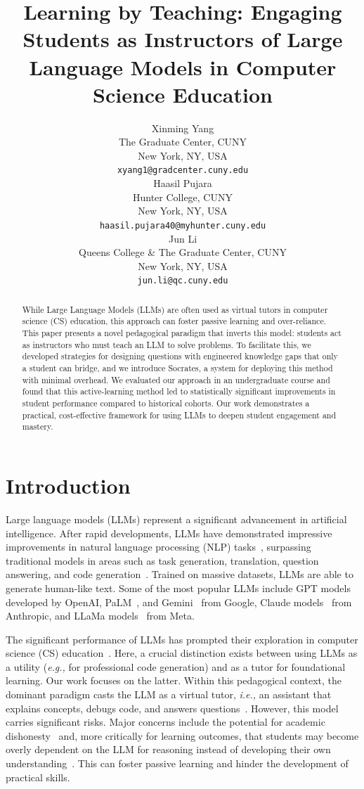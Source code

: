 \documentclass{article} %
\title{Learning by Teaching: Engaging Students as Instructors of Large Language Models in Computer Science Education}
\author{Xinming Yang \\
  The Graduate Center, CUNY \\
  New York, NY, USA \\
  \texttt{xyang1@gradcenter.cuny.edu} \\
  \And
  Haasil Pujara \\
  Hunter College, CUNY \\
  New York, NY, USA \\
  \texttt{haasil.pujara40@myhunter.cuny.edu} \\
  \And
  Jun Li \\
  Queens College \& The Graduate Center, CUNY \\
  New York, NY, USA \\
  \texttt{jun.li@qc.cuny.edu} \\
}
\begin{document}
\ifcolmsubmission
\linenumbers 
\fi

\maketitle

\begin{abstract}
While Large Language Models (LLMs) are often used as virtual tutors in computer science (CS) education, this approach can foster passive learning and over-reliance. This paper presents a novel pedagogical paradigm that inverts this model: students act as instructors who must teach an LLM to solve problems. To facilitate this, we developed strategies for designing questions with engineered knowledge gaps that only a student can bridge, and we introduce \textsf{Socrates}, a system for deploying this method with minimal overhead. We evaluated our approach in an undergraduate course and found that this active-learning method led to statistically significant improvements in student performance compared to historical cohorts. Our work demonstrates a practical, cost-effective framework for using LLMs to deepen student engagement and mastery.
\end{abstract}

\section{Introduction}

Large language models (LLMs) represent a significant advancement in artificial intelligence. After rapid developments, LLMs have demonstrated impressive improvements in natural language processing (NLP) tasks~\citep{zhao2023survey}, surpassing traditional models in areas such as task generation, translation, question answering, and code generation~\citep{yang2024harnessing, cloutier2023fine}. Trained on massive datasets, LLMs are able to generate human-like text. Some of the most popular LLMs include GPT models~\citep{kalyan2023survey,achiam2023gpt} developed by OpenAI, PaLM~\citep{anil2023palm}, and Gemini~\citep{team2023gemini,reid2024gemini} from Google, Claude models~\citep{ anthropic2024claude} from Anthropic, and LLaMa models~\citep{touvron2023llama} from Meta. 


The significant performance of LLMs has prompted their exploration in computer science (CS) education~\citep{raihan2025llms}. Here, a crucial distinction exists between using LLMs as a utility ({\em e.g.,} for professional code generation) and as a tutor for foundational learning. Our work focuses on the latter. Within this pedagogical context, the dominant paradigm casts the LLM as a virtual tutor, {\em i.e.,} an assistant that explains concepts, debugs code, and answers questions~\citep{denny2024desirable,liu2024beyond,kazemitabaar2024codeaid}. However, this model carries significant risks. Major concerns include the potential for academic dishonesty~\citep{british_university_vietnam_academic_2023} and, more critically for learning outcomes, that students may become overly dependent on the LLM for reasoning instead of developing their own understanding~\citep{wang2024large,lee2022generative,bastani2024generative}. This can foster passive learning and hinder the development of practical skills.
\end{document}
